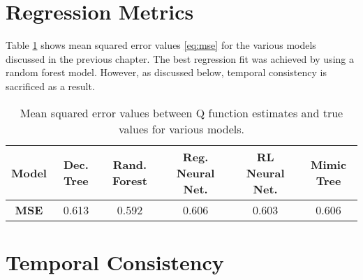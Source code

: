 \documentclass{sfuthesis}
\begin{document}
	\section{Regression Metrics}
	Table \ref{tab:mse-models} shows mean squared error values \eqref{eq:mse} for the various models discussed in the previous chapter. The best regression fit was achieved by using a random forest model. However, as discussed below, temporal consistency is sacrificed as a result.
	\begin{table}[ht]
		\centering
		\begin{tabular}{c|ccccc}
			\textbf{Model} & Dec. Tree & Rand. Forest & Reg. Neural Net. & RL Neural Net. & Mimic Tree \\ \hline
			\textbf{MSE}   & 0.613     & 0.592        & 0.606           & 0.603          & 0.606     
		\end{tabular}
		\caption{Mean squared error values between Q function estimates and true values for various models.}
		\label{tab:mse-models}
	\end{table}

	\section{Temporal Consistency}
	
\end{document}
